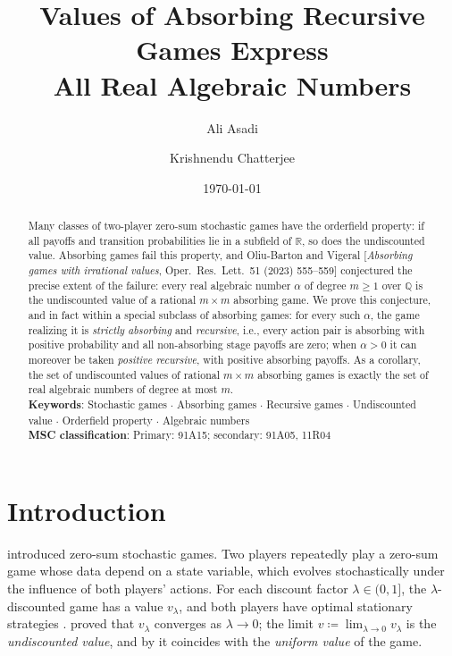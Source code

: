 \documentclass[11pt, a4paper]{article}
\title{Values of Absorbing Recursive Games Express\\ All Real Algebraic Numbers}
\author[1]{Ali Asadi}
\author[1]{Krishnendu Chatterjee}
\affil[1]{Institute of Science and Technology Austria (ISTA), Klosterneuburg, Austria}
\date{\today}
\theoremstyle{plain}
\theoremstyle{definition}
\newcommand{\Q}{\mathbb{Q}}
\newcommand{\R}{\mathbb{R}}
\newcommand{\defas}{\coloneqq}
\begin{document}
\maketitle

\begin{abstract}
    Many classes of two-player zero-sum stochastic games have the orderfield property: if all payoffs and transition probabilities lie in a subfield of $\R$, so does the undiscounted value.
Absorbing games fail this property, and Oliu-Barton and Vigeral [\emph{Absorbing games with irrational values}, Oper.\ Res.\ Lett.\ 51 (2023) 555--559] conjectured the precise extent of the failure:
every real algebraic number $\alpha$ of degree $m\geq 1$ over $\Q$ is the undiscounted value of a rational $m\times m$ absorbing game.
We prove this conjecture, and in fact within a special subclass of absorbing games: for every such $\alpha$, the game realizing it is \emph{strictly absorbing} and \emph{recursive}, i.e., every action pair is absorbing with positive probability and all non-absorbing stage payoffs are zero; when $\alpha>0$ it can moreover be taken \emph{positive recursive}, with positive absorbing payoffs. As a corollary, the set of undiscounted values of rational $m\times m$ absorbing games is exactly the set of real algebraic numbers of degree at most $m$.\\

    \noindent \textbf{Keywords}: Stochastic games $\cdot$ Absorbing games $\cdot$ Recursive games $\cdot$ Undiscounted value $\cdot$ Orderfield property $\cdot$ Algebraic numbers\\

    \noindent \textbf{MSC classification}: Primary: 91A15; secondary: 91A05, 11R04
\end{abstract}


\newpage

\section{Introduction}\label{sec:intro}

\citet{Sha53} introduced zero-sum stochastic games. Two players repeatedly play a zero-sum game whose data depend on a state variable, which evolves stochastically under the influence of both players' actions. For each discount factor $\lambda\in(0,1]$, the $\lambda$-discounted game has a value $v_\lambda$, and both players have optimal stationary strategies \citep{Sha53}. \citet{BK76} proved that $v_\lambda$ converges as $\lambda\to 0$; the limit $v\defas \lim_{\lambda\to 0}v_\lambda$ is the \emph{undiscounted value}, and by \citet{MN81} it coincides with the \emph{uniform value} of the game.
\end{document}
